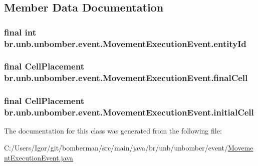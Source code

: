 \subsection{Member Data Documentation}
\hypertarget{classbr_1_1unb_1_1unbomber_1_1event_1_1_movement_execution_event_aeedd19a6a271627531cc6f0408195409}{
\subsubsection[{entity\+Id}]{\setlength{\rightskip}{0pt plus 5cm}final int br.\+unb.\+unbomber.\+event.\+Movement\+Execution\+Event.\+entity\+Id\hspace{0.3cm}{\ttfamily [private]}}}\label{classbr_1_1unb_1_1unbomber_1_1event_1_1_movement_execution_event_aeedd19a6a271627531cc6f0408195409}
\hypertarget{classbr_1_1unb_1_1unbomber_1_1event_1_1_movement_execution_event_acccd6d576e3d1138d3a503ff7513cc5a}{
\subsubsection[{final\+Cell}]{\setlength{\rightskip}{0pt plus 5cm}final {\bf Cell\+Placement} br.\+unb.\+unbomber.\+event.\+Movement\+Execution\+Event.\+final\+Cell\hspace{0.3cm}{\ttfamily [private]}}}\label{classbr_1_1unb_1_1unbomber_1_1event_1_1_movement_execution_event_acccd6d576e3d1138d3a503ff7513cc5a}
\hypertarget{classbr_1_1unb_1_1unbomber_1_1event_1_1_movement_execution_event_a983de322d2ea854004ab7851ba23d7e3}{
\subsubsection[{initial\+Cell}]{\setlength{\rightskip}{0pt plus 5cm}final {\bf Cell\+Placement} br.\+unb.\+unbomber.\+event.\+Movement\+Execution\+Event.\+initial\+Cell\hspace{0.3cm}{\ttfamily [private]}}}\label{classbr_1_1unb_1_1unbomber_1_1event_1_1_movement_execution_event_a983de322d2ea854004ab7851ba23d7e3}


The documentation for this class was generated from the following file\+:\begin{DoxyCompactItemize}
\item 
C\+:/\+Users/\+Igor/git/bomberman/src/main/java/br/unb/unbomber/event/\hyperlink{_movement_execution_event_8java}{Movement\+Execution\+Event.\+java}\end{DoxyCompactItemize}
